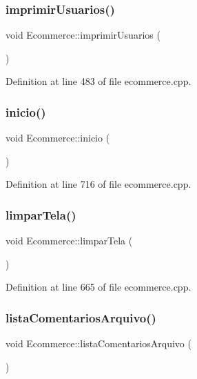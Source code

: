 \subsubsection{\texorpdfstring{imprimir\+Usuarios()}{imprimirUsuarios()}}
{\footnotesize\ttfamily void Ecommerce\+::imprimir\+Usuarios (\begin{DoxyParamCaption}{ }\end{DoxyParamCaption})}



Definition at line 483 of file ecommerce.\+cpp.

\mbox{\label{class_ecommerce_aedc0f3fc9ad6ca9ed9593d4b1e911ade}} 
\subsubsection{\texorpdfstring{inicio()}{inicio()}}
{\footnotesize\ttfamily void Ecommerce\+::inicio (\begin{DoxyParamCaption}{ }\end{DoxyParamCaption})}



Definition at line 716 of file ecommerce.\+cpp.

\mbox{\label{class_ecommerce_a376670f5f33469721d91663d75810e6a}} 
\subsubsection{\texorpdfstring{limpar\+Tela()}{limparTela()}}
{\footnotesize\ttfamily void Ecommerce\+::limpar\+Tela (\begin{DoxyParamCaption}{ }\end{DoxyParamCaption})}



Definition at line 665 of file ecommerce.\+cpp.

\mbox{\label{class_ecommerce_a58be27754c9d87aab236f6cda0f2d7b0}} 
\subsubsection{\texorpdfstring{lista\+Comentarios\+Arquivo()}{listaComentariosArquivo()}}
{\footnotesize\ttfamily void Ecommerce\+::lista\+Comentarios\+Arquivo (\begin{DoxyParamCaption}{ }\end{DoxyParamCaption})}



